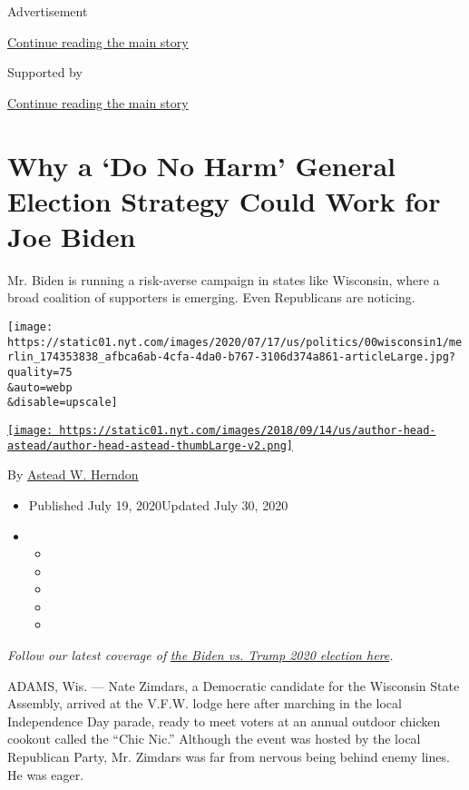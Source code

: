 Advertisement

\protect\hyperlink{after-top}{Continue reading the main story}

Supported by

\protect\hyperlink{after-sponsor}{Continue reading the main story}

\hypertarget{why-a-do-no-harm-general-election-strategy-could-work-for-joe-biden}{%
\section{Why a `Do No Harm' General Election Strategy Could Work for Joe
Biden}\label{why-a-do-no-harm-general-election-strategy-could-work-for-joe-biden}}

Mr. Biden is running a risk-averse campaign in states like Wisconsin,
where a broad coalition of supporters is emerging. Even Republicans are
noticing.

\texttt{[image: https://static01.nyt.com/images/2020/07/17/us/politics/00wisconsin1/merlin\_174353838\_afbca6ab-4cfa-4da0-b767-3106d374a861-articleLarge.jpg?quality=75\\\&auto=webp\\\&disable=upscale]}

\href{https://www.nytimes.com/by/astead-w-herndon}{\texttt{[image: https://static01.nyt.com/images/2018/09/14/us/author-head-astead/author-head-astead-thumbLarge-v2.png]}}

By \href{https://www.nytimes.com/by/astead-w-herndon}{Astead W. Herndon}

\begin{itemize}
\item
  Published July 19, 2020Updated July 30, 2020
\item
  \begin{itemize}
  \item
  \item
  \item
  \item
  \item
  \end{itemize}
\end{itemize}

\emph{Follow our latest coverage of}
\href{https://www.nytimes.com/2020/07/31/us/elections/biden-vs-trump.html}{\emph{the
Biden vs. Trump 2020 election here}}\emph{.}

ADAMS, Wis. --- Nate Zimdars, a Democratic candidate for the Wisconsin
State Assembly, arrived at the V.F.W. lodge here after marching in the
local Independence Day parade, ready to meet voters at an annual outdoor
chicken cookout called the ``Chic Nic.'' Although the event was hosted
by the local Republican Party, Mr. Zimdars was far from nervous being
behind enemy lines. He was eager.

